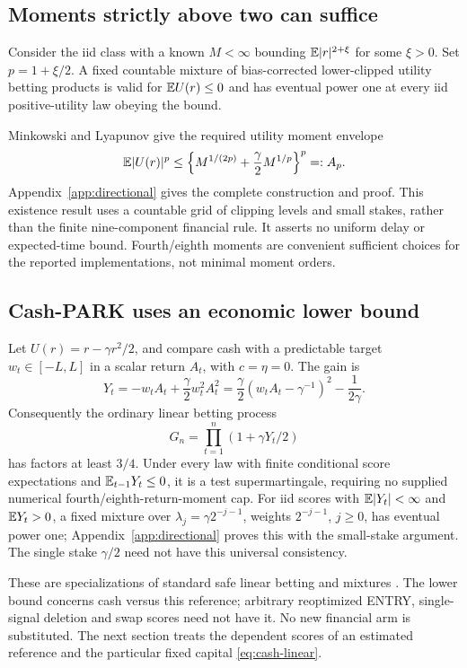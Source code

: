 \subsection{Moments strictly above two can suffice}
\begin{proposition}
\label{prop:above-two}
Consider the iid class with a known $M<\infty$ bounding $\mathbb E|r|^{2+\xi}$
for some $\xi>0$.
Set $p=1+\xi/2$. A fixed countable mixture of bias-corrected lower-clipped
utility betting products is valid for $\mathbb E U(r)\le0$ and has eventual power
one at every iid positive-utility law obeying the bound.
\end{proposition}
Minkowski and Lyapunov give the required utility moment envelope
\begin{equation}
 \mathbb E|U(r)|^p\le
 \left\{M^{1/(2p)}+\frac\gamma2M^{1/p}\right\}^p=:A_p.
 \label{eq:utility-moment-conversion}
\end{equation}
Appendix~\ref{app:directional} gives the complete construction and proof.
This existence result uses a countable grid of clipping levels and small
stakes, rather than the finite nine-component financial rule. It asserts no
uniform delay or expected-time bound. Fourth/eighth moments are convenient
sufficient choices for the reported implementations, not minimal moment orders.

\subsection{Cash-PARK uses an economic lower bound}
Let $U(r)=r-\gamma r^2/2$, and compare cash with a predictable target
$w_t\in[-L,L]$ in a scalar return $A_t$, with $c=\eta=0$. The gain is
\begin{equation}
 Y_t=-w_tA_t+\frac\gamma2w_t^2A_t^2
     =\frac\gamma2(w_tA_t-\gamma^{-1})^2-\frac1{2\gamma}.
 \label{eq:cash-score}
\end{equation}
Consequently the ordinary linear betting process
\begin{equation}
 G_n=\prod_{t=1}^n(1+\gamma Y_t/2)
 \label{eq:cash-linear}
\end{equation}
has factors at least $3/4$. Under every law with finite conditional score
expectations and $\mathbb E_{t-1}Y_t\le0$, it is a test supermartingale, requiring
no supplied numerical fourth/eighth-return-moment cap. For iid scores with
$\mathbb E|Y_t|<\infty$ and $\mathbb E Y_t>0$, a fixed mixture over
$\lambda_j=\gamma2^{-j-1}$, weights $2^{-j-1}$, $j\ge0$, has eventual power
one; Appendix~\ref{app:directional} proves this with the small-stake argument.
The single stake $\gamma/2$ need not have this universal consistency.

These are specializations of standard safe linear betting and mixtures
\cite{savi,boundedbet}. The lower bound concerns cash versus this reference;
arbitrary reoptimized ENTRY, single-signal deletion and swap scores need not
have it. No new financial arm is substituted. The next section treats the
dependent scores of an estimated reference and the particular fixed capital
\eqref{eq:cash-linear}.
